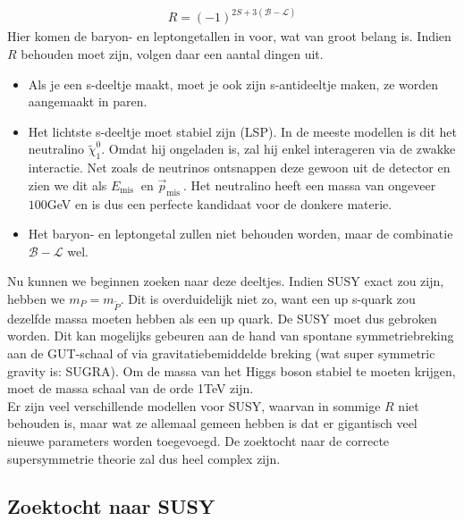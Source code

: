 \documentclass[../main.tex]{subfiles}
\begin{document}
\begin{equation}
    \begin{aligned}
        \label{eq:r_pariteit}
        R=(-1)^{2 S+3(\mathcal{B}-\mathcal{L})}
    \end{aligned}
\end{equation}
Hier komen de baryon- en leptongetallen in voor, wat van groot belang is. Indien $R$ behouden moet zijn, volgen daar een aantal dingen uit.
\begin{itemize}
    \item Als je een s-deeltje maakt, moet je ook zijn s-antideeltje maken, ze worden aangemaakt in paren.
    \item Het lichtste s-deeltje moet stabiel zijn (LSP). In de meeste modellen is dit het neutralino $\tilde{\chi}_{1}^{0}$. Omdat hij ongeladen is, zal hij enkel interageren via de zwakke interactie. Net zoals de neutrinos ontsnappen deze gewoon uit de detector en zien we dit als $E_{\text {mis }}$ en $\vec{p}_{\text {mis }}$. Het neutralino heeft een massa van ongeveer $100$GeV en is dus een perfecte kandidaat voor de donkere materie.
    \item Het baryon- en leptongetal zullen niet behouden worden, maar de combinatie $\mathcal{B}-\mathcal{L}$ wel.
\end{itemize}
Nu kunnen we beginnen zoeken naar deze deeltjes. Indien SUSY exact zou zijn, hebben we $m_{P}=m_{\tilde{P}}$. Dit is overduidelijk niet zo, want een up s-quark zou dezelfde massa moeten hebben als een up quark. De SUSY moet dus gebroken worden. Dit kan mogelijks gebeuren aan de hand van spontane symmetriebreking aan de GUT-schaal of via gravitatiebemiddelde breking (wat super symmetric gravity is: SUGRA). Om de massa van het Higgs boson stabiel te moeten krijgen, moet de massa schaal van de orde 1TeV zijn.\\
Er zijn veel verschillende modellen voor SUSY, waarvan in sommige $R$ niet behouden is, maar wat ze allemaal gemeen hebben is dat er gigantisch veel nieuwe parameters worden toegevoegd. De zoektocht naar de correcte supersymmetrie theorie zal dus heel complex zijn.

\subsection{Zoektocht naar SUSY}%
\label{sub:zoektocht_naar_susy}
\end{document}
